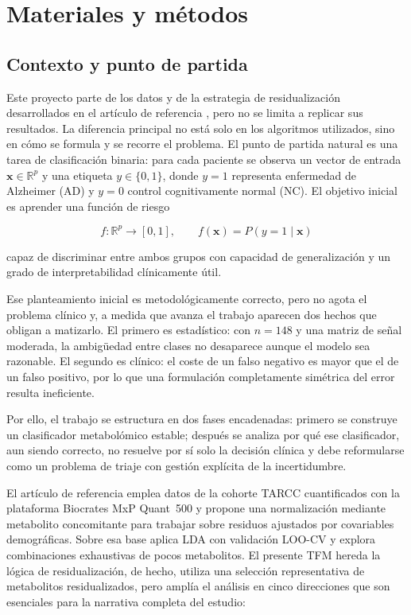 \chapter{Materiales y métodos}\label{chap:materiales}

\section{Contexto y punto de partida}

Este proyecto parte de los datos y de la estrategia de residualización desarrollados en el artículo de referencia
\parencite{bernal2025metabolomics}, pero no se limita a replicar sus resultados. La diferencia principal no está solo en
los algoritmos utilizados, sino en cómo se formula y se recorre el problema. El punto de partida natural es una tarea de
clasificación binaria: para cada paciente se observa un vector de entrada $\mathbf{x} \in \mathbb{R}^p$ y una etiqueta
$y \in \{0,1\}$, donde $y=1$ representa enfermedad de Alzheimer (AD) y $y=0$ control cognitivamente normal (NC). El
objetivo inicial es aprender una función de riesgo

\begin{equation}
f: \mathbb{R}^p \longrightarrow [0,1], \qquad f(\mathbf{x}) = P(y=1\mid\mathbf{x})
\end{equation}

capaz de discriminar entre ambos grupos con capacidad de generalización y un grado de interpretabilidad clínicamente útil.

Ese planteamiento inicial es metodológicamente correcto, pero no agota el problema clínico y, a medida que avanza el
trabajo aparecen dos hechos que obligan a matizarlo. El primero es estadístico: con $n=148$ y una matriz de señal
moderada, la ambigüedad entre clases no desaparece aunque el modelo sea razonable. El segundo es clínico: el coste de un
falso negativo es mayor que el de un falso positivo, por lo que una formulación completamente simétrica del error resulta
ineficiente.

Por ello, el trabajo se estructura en dos fases encadenadas: primero se construye un clasificador metabolómico estable;
después se analiza por qué ese clasificador, aun siendo correcto, no resuelve por sí solo la decisión clínica y debe
reformularse como un problema de triaje con gestión explícita de la incertidumbre.

El artículo de referencia emplea datos de la cohorte TARCC cuantificados con la plataforma Biocrates MxP Quant~500 y
propone una normalización mediante metabolito concomitante para trabajar sobre residuos ajustados por covariables
demográficas. Sobre esa base aplica LDA con validación LOO-CV y explora combinaciones exhaustivas de pocos metabolitos.
El presente TFM hereda la lógica de residualización, de hecho, utiliza una selección representativa de metabolitos
residualizados, pero amplía el análisis en cinco direcciones que son esenciales para la narrativa completa del estudio:

